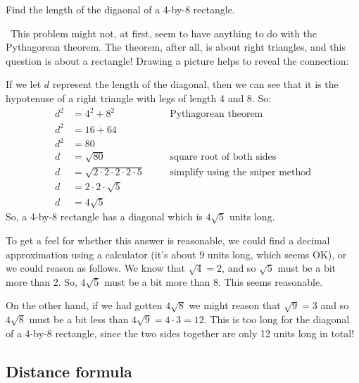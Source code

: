 \begin{boxex}
Find the length of the digaonal of a 4-by-8 rectangle.

\exsoln\ This problem might not, at first, seem to have anything to do with the Pythagorean theorem. The theorem, after all, is about right triangles, and this question is about a rectangle! Drawing a picture helps to reveal the connection:

\begin{center}\end{center}

If we let $d$ represent the length of the diagonal, then we can see that it is the hypotenuse of a right triangle with legs of length 4 and 8. So:
\begin{align*}
d^2	&= 4^2 + 8^2
&&\quad\text{Pythagorean theorem}\\
d^2&= 16 + 64\\
d^2&= 80\\
d 	&= \sqrt{80}
&&\quad\text{square root of both sides}\\
d 	&= \sqrt{2 \cdot 2 \cdot 2 \cdot 2 \cdot 5}
&&\quad\text{simplify using the sniper method}\\
d 	&= 2 \cdot 2 \cdot \sqrt{5}\\
d 	&= 4\sqrt{5}
\end{align*}
So, a 4-by-8 rectangle has a diagonal which is $4\sqrt5$ units long.
\end{boxex}

To get a feel for whether this answer is reasonable, we could find a decimal approximation using a calculator (it's about 9 units long, which seems OK), or we could reason as follows. We know that $\sqrt{4} = 2$, and so $\sqrt{5}$ must be a bit more than 2. So, $4\sqrt{5}$ must be a bit more than 8. This seems reasonable.

On the other hand, if we had gotten $4\sqrt{8}$ we might reason that $\sqrt{9} = 3$ and so $4\sqrt{8}$ must be a bit less than $4\sqrt{9} = 4\cdot3 = 12$. This is too long for the diagonal of a 4-by-8 rectangle, since the two sides together are only 12 units long in total!

\subsection{Distance formula}


